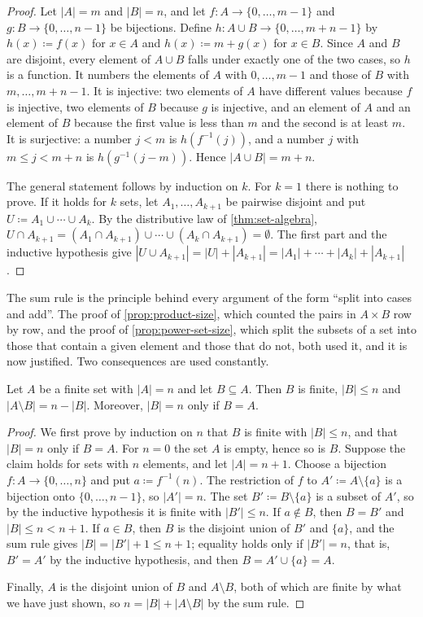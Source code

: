 \begin{proof}
Let $|A|=m$ and $|B|=n$, and let $f\colon A\to\{0,\ldots,m-1\}$ and $g\colon B\to\{0,\ldots,n-1\}$ be bijections. Define $h\colon A\cup B\to\{0,\ldots,m+n-1\}$ by $h(x)\coloneqq f(x)$ for $x\in A$ and $h(x)\coloneqq m+g(x)$ for $x\in B$. Since $A$ and $B$ are disjoint, every element of $A\cup B$ falls under exactly one of the two cases, so $h$ is a function. It numbers the elements of $A$ with $0,\ldots,m-1$ and those of $B$ with $m,\ldots,m+n-1$. It is injective: two elements of $A$ have different values because $f$ is injective, two elements of $B$ because $g$ is injective, and an element of $A$ and an element of $B$ because the first value is less than $m$ and the second is at least $m$. It is surjective: a number $j<m$ is $h(f^{-1}(j))$, and a number $j$ with $m\le j<m+n$ is $h(g^{-1}(j-m))$. Hence $|A\cup B|=m+n$.

The general statement follows by induction on $k$. For $k=1$ there is nothing to prove. If it holds for $k$ sets, let $A_1,\ldots,A_{k+1}$ be pairwise disjoint and put $U\coloneqq A_1\cup\cdots\cup A_k$. By the distributive law of \cref{thm:set-algebra}, $U\cap A_{k+1}=(A_1\cap A_{k+1})\cup\cdots\cup(A_k\cap A_{k+1})=\emptyset$. The first part and the inductive hypothesis give $|U\cup A_{k+1}|=|U|+|A_{k+1}|=|A_1|+\cdots+|A_k|+|A_{k+1}|$.
\end{proof}

The sum rule is the principle behind every argument of the form ``split into cases and add''. The proof of \cref{prop:product-size}, which counted the pairs in $A\times B$ row by row, and the proof of \cref{prop:power-set-size}, which split the subsets of a set into those that contain a given element and those that do not, both used it, and it is now justified. Two consequences are used constantly.

\begin{lemma}
\label{lem:subset-finite}
Let $A$ be a finite set with $|A|=n$ and let $B\subseteq A$. Then $B$ is finite, $|B|\le n$ and $|A\setminus B|=n-|B|$. Moreover, $|B|=n$ only if $B=A$.
\end{lemma}

\begin{proof}
We first prove by induction on $n$ that $B$ is finite with $|B|\le n$, and that $|B|=n$ only if $B=A$. For $n=0$ the set $A$ is empty, hence so is $B$. Suppose the claim holds for sets with $n$ elements, and let $|A|=n+1$. Choose a bijection $f\colon A\to\{0,\ldots,n\}$ and put $a\coloneqq f^{-1}(n)$. The restriction of $f$ to $A'\coloneqq A\setminus\{a\}$ is a bijection onto $\{0,\ldots,n-1\}$, so $|A'|=n$. The set $B'\coloneqq B\setminus\{a\}$ is a subset of $A'$, so by the inductive hypothesis it is finite with $|B'|\le n$. If $a\notin B$, then $B=B'$ and $|B|\le n<n+1$. If $a\in B$, then $B$ is the disjoint union of $B'$ and $\{a\}$, and the sum rule gives $|B|=|B'|+1\le n+1$; equality holds only if $|B'|=n$, that is, $B'=A'$ by the inductive hypothesis, and then $B=A'\cup\{a\}=A$.

Finally, $A$ is the disjoint union of $B$ and $A\setminus B$, both of which are finite by what we have just shown, so $n=|B|+|A\setminus B|$ by the sum rule.
\end{proof}

